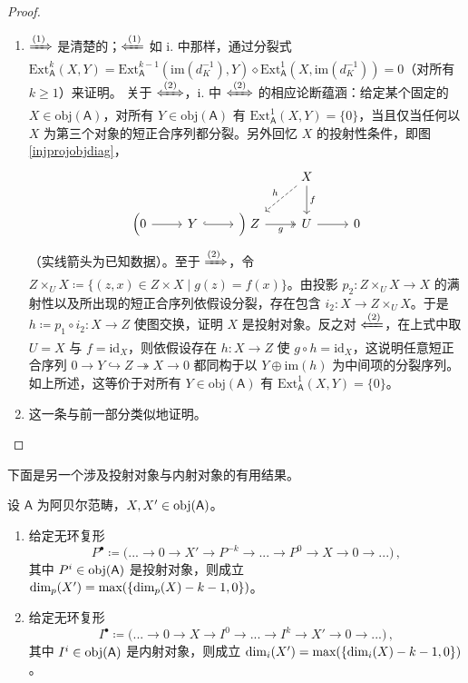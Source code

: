 \begin{proof}
\begin{enumerate}[leftmargin=0.5cm]
		\item $\xRightarrow{(1)}$ 是清楚的；$\xLeftarrow{(1)}$ 如 i. 中那样，通过分裂式 $\text{Ext}_\mathsf{A}^k(X,Y)=\text{Ext}_\mathsf{A}^{k-1}(\text{im}(d_K^{-1}),Y)\diamond\text{Ext}_\mathsf{A}^1(X,\text{im}(d_K^{-1}))=0$（对所有 $k\geq 1$）来证明。
		\newline 关于 $\xLeftrightarrow{(2)}$，i. 中 $\xLeftrightarrow{(2)}$ 的相应论断蕴涵：给定某个固定的 $X\in\text{obj}(\mathsf{A})$，对所有 $Y\in\text{obj}(\mathsf{A})$ 有 $\text{Ext}_\mathsf{A}^1(X,Y)=\{0\}$，当且仅当任何以 $X$ 为第三个对象的短正合序列都分裂。另外回忆 $X$ 的投射性条件，即图 \eqref{injprojobjdiag}，\vspace*{-0.5cm} 
		\[
		\begin{tikzcd}
			& & & X\arrow[dl, dashed, "h"']\arrow[d, "f"] & \\
			\Big(0\arrow[r] & Y\arrow[r, hook] & \Big)\;Z\arrow[r, two heads, "g"'] & U\arrow[r] & 0
		\end{tikzcd}\vspace*{-0.3cm}
		\]
		（实线箭头为已知数据）。至于 $\xRightarrow{(2)}$，令 $Z\times_U X\!\coloneqq\!\{(z,x)\in Z\!\times\! X\mid g(z)\!=\!f(x)\}$。由投影 $p_2:Z\times_U X\rightarrow X$ 的满射性以及所出现的短正合序列依假设分裂，存在包含 $i_2:X\rightarrow Z\times_U X$。于是 $h\coloneqq p_1\circ i_2:X\rightarrow Z$ 使图交换，证明 $X$ 是投射对象。反之对 $\xLeftarrow{(2)}$，在上式中取 $U=X$ 与 $f=\text{id}_X$，则依假设存在 $h:X\rightarrow Z$ 使 $g\circ h=\text{id}_X$，这说明任意短正合序列 $0\rightarrow Y\hookrightarrow Z \twoheadrightarrow X\rightarrow 0$ 都同构于以 $Y\oplus\text{im}(h)$ 为中间项的分裂序列。如上所述，这等价于对所有 $Y\in\text{obj}(\mathsf{A})$ 有 $\text{Ext}_\mathsf{A}^1(X,Y)=\{0\}$。
		
		\item 这一条与前一部分类似地证明。 
	\end{enumerate}\vspace*{-0.5cm}
\end{proof}

下面是另一个涉及投射对象与内射对象的有用结果。

\begin{Lem}
	设 $\mathsf{A}$ 为阿贝尔范畴，$X,X'\in\textup{obj}(\mathsf{A})$。
	\renewcommand{\theenumi}{\roman{enumi}}
	\begin{enumerate}[leftmargin=0.5cm]
		\item 给定无环复形
		\[
		P^\bullet\coloneqq\big(...\rightarrow 0\rightarrow X'\rightarrow P^{-k}\rightarrow...\rightarrow P^0\rightarrow X\rightarrow 0\rightarrow...\big)\,,
		\]
		其中 $P^i\in\textup{obj}(\mathsf{A})$ 是投射对象，则成立 $\textup{dim}_p(X')=\textup{max}(\{\textup{dim}_p(X)-k-1,0\})$。
		
		\item 给定无环复形
		\[
		I^\bullet\coloneqq\big(...\rightarrow 0\rightarrow X\rightarrow I^0\rightarrow...\rightarrow I^k\rightarrow X'\rightarrow 0\rightarrow...\big)\,,
		\]
		其中 $I^i\in\textup{obj}(\mathsf{A})$ 是内射对象，则成立 $\textup{dim}_i(X')=\textup{max}(\{\textup{dim}_i(X)-k-1,0\})$。 
	\end{enumerate}
\end{Lem}


